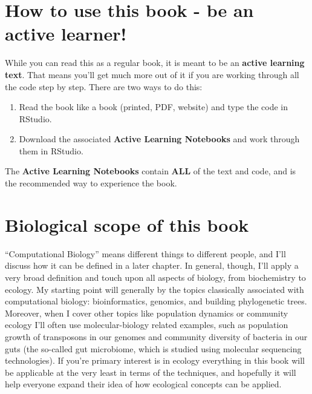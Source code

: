 \documentclass[
]{book}
\providecommand{\tightlist}{%
  \setlength{\itemsep}{0pt}\setlength{\parskip}{0pt}}
\begin{document}
\hypertarget{how-to-use-this-book---be-an-active-learner}{%
\section{How to use this book - be an active learner!}\label{how-to-use-this-book---be-an-active-learner}}

While you can read this as a regular book, it is meant to be an \textbf{active learning text}. That means you'll get much more out of it if you are working through all the code step by step. There are two ways to do this:

\begin{enumerate}
\def\labelenumi{\arabic{enumi}.}
\tightlist
\item
  Read the book like a book (printed, PDF, website) and type the code in RStudio.
\item
  Download the associated \textbf{Active Learning Notebooks} and work through them in RStudio.
\end{enumerate}

The \textbf{Active Learning Notebooks} contain \textbf{ALL} of the text and code, and is the recommended way to experience the book.

\hypertarget{biological-scope-of-this-book}{%
\section{Biological scope of this book}\label{biological-scope-of-this-book}}

``Computational Biology'' means different things to different people, and I'll discuss how it can be defined in a later chapter. In general, though, I'll apply a very broad definition and touch upon all aspects of biology, from biochemistry to ecology. My starting point will generally by the topics classically associated with computational biology: bioinformatics, genomics, and building phylogenetic trees. Moreover, when I cover other topics like population dynamics or community ecology I'll often use molecular-biology related examples, such as population growth of transposons in our genomes and community diversity of bacteria in our guts (the so-called gut microbiome, which is studied using molecular sequencing technologies). If you're primary interest is in ecology everything in this book will be applicable at the very least in terms of the techniques, and hopefully it will help everyone expand their idea of how ecological concepts can be applied.
\end{document}
